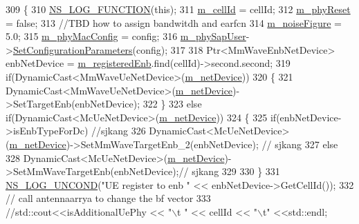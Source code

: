 \begin{DoxyCode}
309 \{
310 \hyperlink{log-macros-disabled_8h_a90b90d5bad1f39cb1b64923ea94c0761}{NS\_LOG\_FUNCTION}(\textcolor{keyword}{this});
311         \hyperlink{classns3_1_1MmWavePhy_a0594531da45f93220d4f5de292bae823}{m\_cellId} = cellId;
312         \hyperlink{classns3_1_1MmWaveUePhy_a64e6caf030c2a285fd561cf5e28f309d}{m\_phyReset} = \textcolor{keyword}{false};
313         \textcolor{comment}{//TBD how to assign bandwitdh and earfcn}
314         \hyperlink{classns3_1_1MmWavePhy_ac3010f7611906c8dc5e93bc13ff79819}{m\_noiseFigure} = 5.0;
315         \hyperlink{classns3_1_1MmWavePhy_a869abf36bbdbb94eed77ba6e4846f6e4}{m\_phyMacConfig} = config;
316         \hyperlink{classns3_1_1MmWaveUePhy_ada28b24f0029ea9fbe7e02f1fb9c918e}{m\_phySapUser}->\hyperlink{classns3_1_1MmWaveUePhySapUser_a5fbbcdd188f30c4cb0bafac3eb057fd6}{SetConfigurationParameters}(config);
317 
318         Ptr<MmWaveEnbNetDevice> enbNetDevice = \hyperlink{classns3_1_1MmWaveUePhy_a30d6221ea89c1d9fdc74b88da0b8360f}{m\_registeredEnb}.find(cellId)->second.second;
319         \textcolor{keywordflow}{if}(DynamicCast<MmWaveUeNetDevice>(\hyperlink{classns3_1_1MmWavePhy_a0f14f4e8f7539b06497ba321d9df344c}{m\_netDevice}))
320         \{
321                 DynamicCast<MmWaveUeNetDevice>(\hyperlink{classns3_1_1MmWavePhy_a0f14f4e8f7539b06497ba321d9df344c}{m\_netDevice})->SetTargetEnb(enbNetDevice);
322         \}
323         \textcolor{keywordflow}{else} \textcolor{keywordflow}{if}(DynamicCast<McUeNetDevice>(\hyperlink{classns3_1_1MmWavePhy_a0f14f4e8f7539b06497ba321d9df344c}{m\_netDevice}))
324         \{
325                 \textcolor{keywordflow}{if}(enbNetDevice->isEnbTypeForDc) \textcolor{comment}{//sjkang}
326                 DynamicCast<McUeNetDevice>(\hyperlink{classns3_1_1MmWavePhy_a0f14f4e8f7539b06497ba321d9df344c}{m\_netDevice})->SetMmWaveTargetEnb\_2(enbNetDevice); \textcolor{comment}{//
      sjkang}
327                 \textcolor{keywordflow}{else}
328                 DynamicCast<McUeNetDevice>(\hyperlink{classns3_1_1MmWavePhy_a0f14f4e8f7539b06497ba321d9df344c}{m\_netDevice})->SetMmWaveTargetEnb(enbNetDevice);\textcolor{comment}{//
      sjkang}
329 
330         \}
331         \hyperlink{log-macros-disabled_8h_a0b36e5e182b37194f85ef1c5e979fb2e}{NS\_LOG\_UNCOND}(\textcolor{stringliteral}{"UE register to enb "} << enbNetDevice->GetCellId());
332                 \textcolor{comment}{// call antennaarrya to change the bf vector}
333         \textcolor{comment}{//std::cout<<isAdditionalUePhy << "\(\backslash\)t " << cellId << "\(\backslash\)t" <<std::endl;}

\end{DoxyCode}
